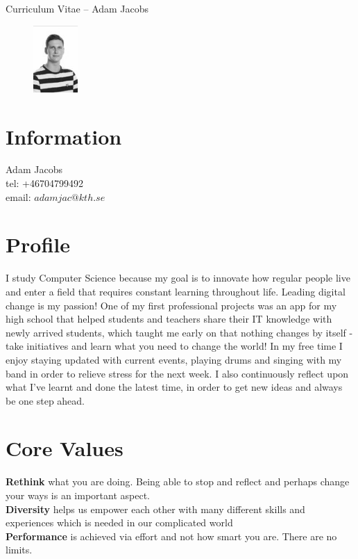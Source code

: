 \documentclass[margin,line,a4paper]{resume}
\begin{document}
{\sc \Large Curriculum Vitae -- Adam Jacobs}
\begin{resume}
    \vspace{0.01cm}
    \begin{figure}
        \vspace{-1cm}
       \begin{center}
       \includegraphics[width=0.15\textwidth]{adamjacobs}
       \end{center}
        \vspace{-1cm}
    \end{figure}
    
    \section{\mysidestyle Information}%
    Adam Jacobs \\
    tel: +46704799492 \\
    email: $adamjac@kth.se$
    \href{} \\

\section{\mysidestyle Profile}\vspace{1mm}
    I study Computer Science because my goal is to innovate how regular people live and enter a field that requires constant learning throughout life. Leading digital change is my passion! One of my first professional projects was an app for my high school that helped students and teachers share their IT knowledge with newly arrived students, which taught me early on that nothing changes by itself - take initiatives and learn what you need to change the world!  
In my free time I enjoy staying updated with current events, playing drums and singing with my band in order to relieve stress for the next week. I also continuously reflect upon what I've learnt and done the latest time, in order to get new ideas and always be one step ahead.

\section{\mysidestyle Core Values}\vspace{1mm}
    \textbf{Rethink} what you are doing. Being able to stop and reflect and perhaps change your ways is an important aspect.
    \\
     \textbf{Diversity} helps us empower each other with many different skills and experiences which is needed in our complicated world
    \\
    \textbf{Performance} is achieved via effort and not how smart you are. There are no limits.


\end{resume}
\end{document}
